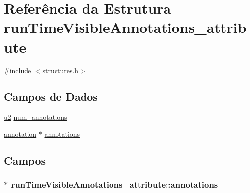 \hypertarget{structrunTimeVisibleAnnotations__attribute}{}\section{Referência da Estrutura run\+Time\+Visible\+Annotations\+\_\+attribute}
\label{structrunTimeVisibleAnnotations__attribute}


{\ttfamily \#include $<$structures.\+h$>$}

\subsection*{Campos de Dados}
\begin{DoxyCompactItemize}
\item 
\hyperlink{lista__operandos_8h_a732cde1300aafb73b0ea6c2558a7a54f}{u2} \hyperlink{structrunTimeVisibleAnnotations__attribute_a1b180c3313acd68fb6956135bad01345}{num\+\_\+annotations}
\item 
\hyperlink{structannotation}{annotation} $\ast$ \hyperlink{structrunTimeVisibleAnnotations__attribute_a26ee34fb2f6d38aa18cd692099fe0e40}{annotations}
\end{DoxyCompactItemize}


\subsection{Campos}
\subsubsection[{\texorpdfstring{annotations}{annotations}}]{$\ast$ run\+Time\+Visible\+Annotations\+\_\+attribute\+::annotations}\hypertarget{structrunTimeVisibleAnnotations__attribute_a26ee34fb2f6d38aa18cd692099fe0e40}{}\label{structrunTimeVisibleAnnotations__attribute_a26ee34fb2f6d38aa18cd692099fe0e40}
